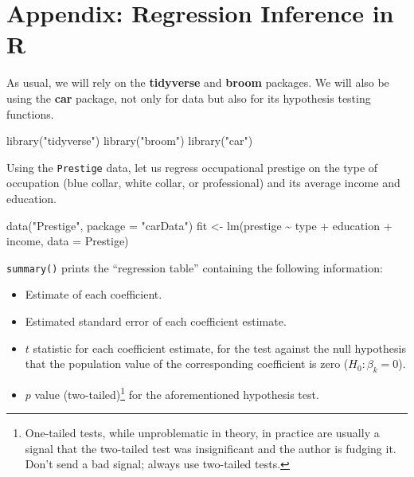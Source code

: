 \documentclass[
  12pt,
  oneside,openany]{book}
\newenvironment{Shaded}{\begin{snugshade}}{\end{snugshade}}
\newcommand{\AttributeTok}[1]{\textcolor[rgb]{0.77,0.63,0.00}{#1}}
\newcommand{\FunctionTok}[1]{\textcolor[rgb]{0.00,0.00,0.00}{#1}}
\newcommand{\NormalTok}[1]{#1}
\newcommand{\OtherTok}[1]{\textcolor[rgb]{0.56,0.35,0.01}{#1}}
\newcommand{\SpecialCharTok}[1]{\textcolor[rgb]{0.00,0.00,0.00}{#1}}
\newcommand{\StringTok}[1]{\textcolor[rgb]{0.31,0.60,0.02}{#1}}
\providecommand{\tightlist}{%
  \setlength{\itemsep}{0pt}\setlength{\parskip}{0pt}}
\begin{document}
\hypertarget{appendix-regression-inference-in-r}{%
\section{Appendix: Regression Inference in R}\label{appendix-regression-inference-in-r}}

As usual, we will rely on the \textbf{tidyverse} and \textbf{broom} packages. We will also be using the \textbf{car} package, not only for data but also for its hypothesis testing functions.

\begin{Shaded}
\begin{Highlighting}[]
\FunctionTok{library}\NormalTok{(}\StringTok{"tidyverse"}\NormalTok{)}
\FunctionTok{library}\NormalTok{(}\StringTok{"broom"}\NormalTok{)}
\FunctionTok{library}\NormalTok{(}\StringTok{"car"}\NormalTok{)}
\end{Highlighting}
\end{Shaded}

Using the \texttt{Prestige} data, let us regress occupational prestige on the type of occupation (blue collar, white collar, or professional) and its average income and education.

\begin{Shaded}
\begin{Highlighting}[]
\FunctionTok{data}\NormalTok{(}\StringTok{"Prestige"}\NormalTok{, }\AttributeTok{package =} \StringTok{"carData"}\NormalTok{)}
\NormalTok{fit }\OtherTok{\textless{}{-}} \FunctionTok{lm}\NormalTok{(prestige }\SpecialCharTok{\textasciitilde{}}\NormalTok{ type }\SpecialCharTok{+}\NormalTok{ education }\SpecialCharTok{+}\NormalTok{ income, }\AttributeTok{data =}\NormalTok{ Prestige)}
\end{Highlighting}
\end{Shaded}

\texttt{summary()} prints the ``regression table'' containing the following information:

\begin{itemize}
\tightlist
\item
  Estimate of each coefficient.
\item
  Estimated standard error of each coefficient estimate.
\item
  \(t\) statistic for each coefficient estimate, for the test against the null hypothesis that the population value of the corresponding coefficient is zero (\(H_0 : \beta_k = 0\)).
\item
  \(p\) value (two-tailed)\footnote{One-tailed tests, while unproblematic in theory, in practice are usually a signal that the two-tailed test was insignificant and the author is fudging it. Don't send a bad signal; always use two-tailed tests.} for the aforementioned hypothesis test.
\end{itemize}
\end{document}

